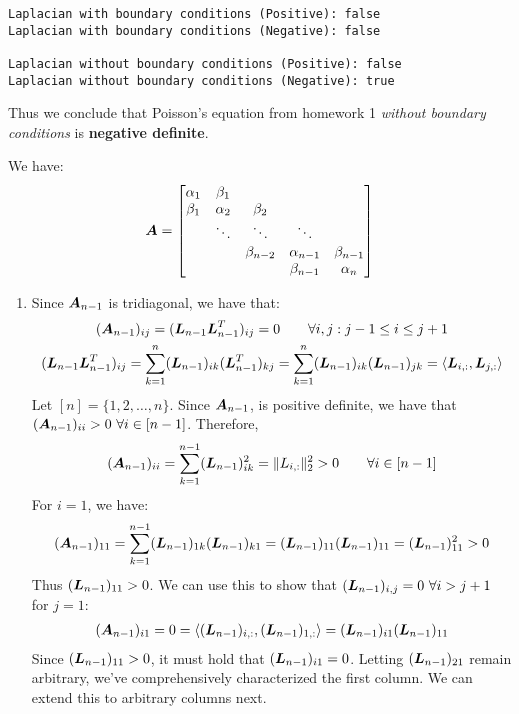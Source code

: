 \documentclass[]{exam}
\begin{document}
\begin{questions}
\begin{enumerate}[label=\arabic*.]
\begin{lstlisting}
Laplacian with boundary conditions (Positive): false
Laplacian with boundary conditions (Negative): false

Laplacian without boundary conditions (Positive): false
Laplacian without boundary conditions (Negative): true
\end{lstlisting}
\end{enumerate}
Thus we conclude that Poisson's equation from homework 1 \textit{without boundary conditions} is \textbf{negative definite}.

\newpage
\question
\hfill

We have:
\begin{gather*}
	\boldsymbol{A} = \begin{bmatrix} \alpha_1 & \beta_1 \\ \beta_1 & \alpha_2 & \beta_2 \\ & \ddots & \ddots & \ddots \\ & & \beta_{n-2} & \alpha_{n-1} & \beta_{n-1} \\ & & & \beta_{n-1} & \alpha_n \end{bmatrix} \\
\end{gather*}

\begin{enumerate}[label=\arabic*.]
	\item Since $\boldsymbol{A}_{n-1}$ is tridiagonal, we have that:
		\begin{gather*}
			(\boldsymbol{A}_{n-1})_{ij} = (\boldsymbol{L}_{n-1} \boldsymbol{L}_{n-1}^T)_{ij} = 0 \qquad \forall i,j : j - 1 \leq i \leq j + 1 \\
			(\boldsymbol{L}_{n-1} \boldsymbol{L}_{n-1}^T)_{ij} = \sum^n_{k=1} (\boldsymbol{L}_{n-1})_{ik} (\boldsymbol{L}_{n-1}^T)_{kj}
			= \sum^n_{k=1} (\boldsymbol{L}_{n-1})_{ik} (\boldsymbol{L}_{n-1})_{jk} = \langle \boldsymbol{L}_{i, :}, \boldsymbol{L}_{j, :} \rangle
		\end{gather*}
		Let $[n] = \{1, 2, \ldots, n\}$.
		Since $\boldsymbol{A}_{n-1}$, is positive definite, we have that $(\boldsymbol{A}_{n-1})_{ii} > 0~\forall i \in [n-1]$. Therefore,
		\begin{gather*}
			(\boldsymbol{A}_{n-1})_{ii} = \sum^{n-1}_{k=1} (\boldsymbol{L}_{n-1})_{ik}^2 = \| L_{i, :} \|^2_2 > 0 \qquad \forall i \in [n - 1]
		\end{gather*}
		For $i=1$, we have:
		\begin{gather*}
			(\boldsymbol{A}_{n-1})_{11} = \sum^{n-1}_{k=1} (\boldsymbol{L}_{n-1})_{1k} (\boldsymbol{L}_{n-1})_{k1} = (\boldsymbol{L}_{n-1})_{11} (\boldsymbol{L}_{n-1})_{11} = (\boldsymbol{L}_{n-1})_{11}^2 > 0
		\end{gather*}
		Thus $(\boldsymbol{L}_{n-1})_{11} > 0$. We can use this to show that $(\boldsymbol{L}_{n-1})_{i, j} = 0~\forall i > j + 1$ for $j = 1$:
		\begin{gather*}
			(\boldsymbol{A}_{n-1})_{i1} = 0 = \langle (\boldsymbol{L}_{n-1})_{i, :}, (\boldsymbol{L}_{n-1})_{1, :} \rangle = (\boldsymbol{L}_{n-1})_{i1} (\boldsymbol{L}_{n-1})_{11}
		\end{gather*}
		Since $(\boldsymbol{L}_{n-1})_{11} > 0$, it must hold that $(\boldsymbol{L}_{n-1})_{i1} = 0$. Letting $(\boldsymbol{L}_{n-1})_{21}$ remain arbitrary, we've comprehensively characterized the first column. We can extend this to arbitrary columns next.


\end{enumerate}
\end{questions}
\end{document}

